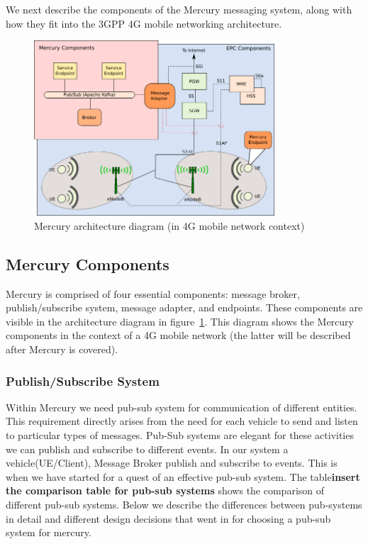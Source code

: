 We next describe the components of the Mercury messaging system, along
with how they fit into the 3GPP 4G mobile networking architecture.

\begin{figure}[ht]
  \centering
  \includegraphics[width=0.8\textwidth]{figs/mercury-arch.png}
  \caption{Mercury architecture diagram (in 4G mobile network context)}
  \label{fig:arch}
\end{figure}

\subsection{Mercury Components}

Mercury is comprised of four essential components: message broker,
publish/subscribe system, message adapter, and endpoints.  These
components are visible in the architecture diagram in
figure~\ref{fig:arch}. This diagram shows the Mercury components
in the context of a 4G mobile network (the latter will be described
after Mercury is covered).


\subsubsection{Publish/Subscribe System}

Within Mercury we need pub-sub system for communication of different entities. 
This requirement directly arises from the need for each vehicle to send and 
listen to particular types of messages. Pub-Sub systems are elegant for these 
activities we can publish and subscribe to different events. In our system a 
vehicle(UE/Client), Message Broker publish and subscribe to events. This is when
we have started for a quest of an effective pub-sub system. The table{\bf insert
the comparison table for pub-sub systems} shows the comparison of different 
pub-sub systems. Below we describe the differences between pub-systems in detail
and different design decisions that went in for choosing a pub-sub system for
mercury.
 
